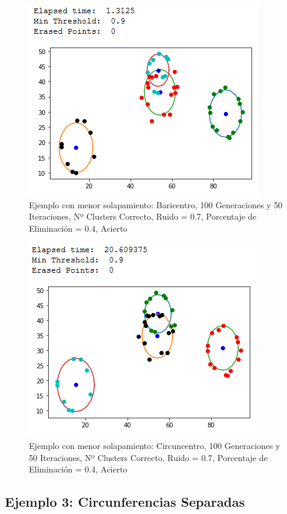 \documentclass[conference,a4paper]{IEEEtran}
\begin{document}
\begin{figure}[H]
\centering
\includegraphics[scale=0.65]{Experimentacion/EjemploMenorSolapamiento/ejms_b_100_50_re_correct}
\caption{Ejemplo con menor solapamiento: Baricentro, 100 Generaciones y 50 Iteraciones,  Nº Clusters Correcto, Ruido = 0.7, Porcentaje de Eliminación = 0.4, Acierto\\}
\end{figure}

\begin{figure}[H]
\centering
\includegraphics[scale=0.65]{Experimentacion/EjemploMenorSolapamiento/ejms_c_100_50_re_correct}
\caption{Ejemplo con menor solapamiento: Circuncentro, 100 Generaciones y 50 Iteraciones,  Nº Clusters Correcto, Ruido = 0.7, Porcentaje de Eliminación = 0.4, Acierto\\}
\end{figure}

\subsection{Ejemplo 3: Circunferencias Separadas}
\end{document}
